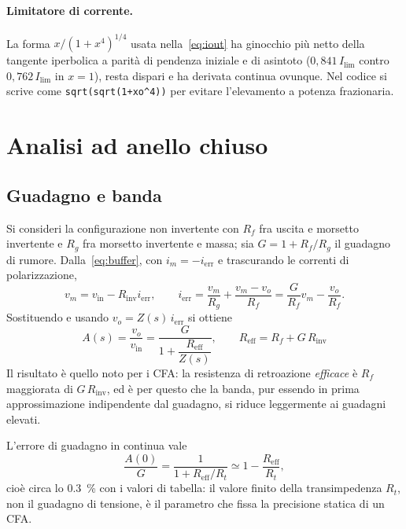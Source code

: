 \documentclass[11pt,a4paper]{article}
\begin{document}
\paragraph{Limitatore di corrente.} La forma
$x/(1+x^{4})^{1/4}$ usata nella~\eqref{eq:iout} ha ginocchio più netto della
tangente iperbolica a parità di pendenza iniziale e di asintoto
($0{,}841\,I_{\mathrm{lim}}$ contro $0{,}762\,I_{\mathrm{lim}}$ in $x=1$),
resta dispari e ha derivata continua ovunque. Nel codice si scrive come
\texttt{sqrt(sqrt(1+xo\^{}4))} per evitare l'elevamento a potenza frazionaria.

\section{Analisi ad anello chiuso}

\subsection{Guadagno e banda}

Si consideri la configurazione non invertente con $R_f$ fra uscita e
morsetto invertente e $R_g$ fra morsetto invertente e massa; sia
$G = 1 + R_f/R_g$ il guadagno di rumore. Dalla~\eqref{eq:buffer}, con
$i_m=-i_{\mathrm{err}}$ e trascurando le correnti di polarizzazione,
\begin{equation}
  v_m = v_{\mathrm{in}} - R_{\mathrm{inv}} i_{\mathrm{err}},
  \qquad
  i_{\mathrm{err}} = \frac{v_m}{R_g} + \frac{v_m - v_o}{R_f}
                   = \frac{G}{R_f} v_m - \frac{v_o}{R_f}.
\end{equation}
Sostituendo e usando $v_o = Z(s)\,i_{\mathrm{err}}$ si ottiene
\begin{equation}
  \boxed{\;
  A(s) = \frac{v_o}{v_{\mathrm{in}}}
       = \frac{G}{1 + \dfrac{R_{\mathrm{eff}}}{Z(s)}},
  \qquad
  R_{\mathrm{eff}} = R_f + G\,R_{\mathrm{inv}} \; }
  \label{eq:cl}
\end{equation}
Il risultato è quello noto per i CFA: la resistenza di retroazione
\emph{efficace} è $R_f$ maggiorata di $G\,R_{\mathrm{inv}}$, ed è per questo
che la banda, pur essendo in prima approssimazione indipendente dal
guadagno, si riduce leggermente ai guadagni elevati.

L'errore di guadagno in continua vale
\begin{equation}
  \frac{A(0)}{G} = \frac{1}{1 + R_{\mathrm{eff}}/R_t} \simeq 1 - \frac{R_{\mathrm{eff}}}{R_t},
\end{equation}
cioè circa lo \SI{0.3}{\percent} con i valori di tabella: il valore finito
della transimpedenza $R_t$, non il guadagno di tensione, è il parametro che
fissa la precisione statica di un CFA.
\end{document}
